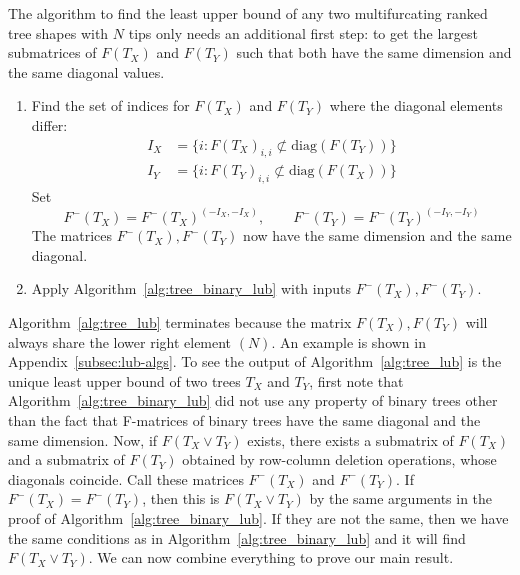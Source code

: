 \documentclass{article}
\begin{document}
The algorithm to find the least upper bound of any two multifurcating ranked tree shapes with $N$ tips only needs an additional first step: to get the largest submatrices of $F(T_X)$ and $F(T_Y)$ such that both have the same dimension and the same diagonal values. \\

\begin{algorithm}[H]
\caption{Algorithm to find the least upper bound of two multifurcating ranked tree shapes}
\label{alg:tree_lub}
\vspace{0.1in}
\vspace{0.1in}

\begin{enumerate}
    \item Find the set of indices for $F(T_X)$ and $F(T_Y)$ where the diagonal elements differ: 
    \begin{align*}
        I_X &= \{i: F(T_X)_{i,i} \not\subset \text{diag}(F(T_Y))\} \\
        I_Y &= \{i: F(T_Y)_{i,i} \not\subset \text{diag}(F(T_X))\}
    \end{align*}
    Set \[ F^-(T_X) = F^-(T_X)^{(-I_X, -I_X)}, \qquad F^-(T_Y) = F^-(T_Y)^{(-I_Y, -I_Y)}\] The matrices $F^-(T_X), F^-(T_Y)$ now have the same dimension and the same diagonal. 
    \item Apply Algorithm~\ref{alg:tree_binary_lub} with inputs $F^-(T_X), F^-(T_Y)$. 
\end{enumerate}
\end{algorithm} 
\vspace{0.1in}

Algorithm~\ref{alg:tree_lub} terminates because the matrix $F(T_X), F(T_Y)$ will always share the lower right element $(N)$. An example is shown in Appendix~\ref{subsec:lub-algs}. To see the output of Algorithm~\ref{alg:tree_lub} is the unique least upper bound of two trees $T_{X}$ and $T_{Y}$, first note that Algorithm~\ref{alg:tree_binary_lub} did not use any property of binary trees other than the fact that F-matrices of binary trees have the same diagonal and the same dimension. Now, if $F(T_{X}\vee T_{Y})$ exists, there exists a submatrix of $F(T_{X})$ and a submatrix of $F(T_{Y})$ obtained by row-column deletion operations, whose diagonals coincide. Call these matrices $F^-(T_X)$ and $F^-(T_Y)$. If $ F^-(T_X)= F^-(T_Y)$, then this is $F(T_{X}\vee T_{Y})$ by the same arguments in the proof of Algorithm~\ref{alg:tree_binary_lub}. If they are not the same, then we have the same conditions as in Algorithm~\ref{alg:tree_binary_lub} and it will find $F(T_{X} \vee T_{Y})$. We can now combine everything to prove our main result. 
\end{document}
